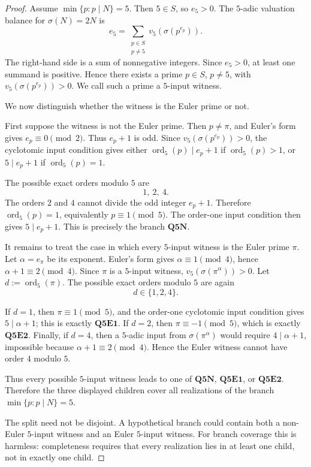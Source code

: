 \documentclass[11pt]{article}
\theoremstyle{definition}
\theoremstyle{remark}
\begin{document}
\begin{proof}
Assume \(\min\{p:p\mid N\}=5\).  Then \(5\in S\), so \(e_5>0\).  The
\(5\)-adic valuation balance for \(\sigma(N)=2N\) is
\[
  e_5
  =
  \sum_{\substack{p\in S\\p\ne5}}
  v_5(\sigma(p^{e_p})).
\]
The right-hand side is a sum of nonnegative integers.  Since \(e_5>0\), at least
one summand is positive.  Hence there exists a prime \(p\in S\), \(p\ne5\),
with \(v_5(\sigma(p^{e_p}))>0\).  We call such a prime a \(5\)-input witness.

We now distinguish whether the witness is the Euler prime or not.

First suppose the witness is not the Euler prime.  Then \(p\ne\pi\), and Euler's
form gives \(e_p\equiv0\pmod2\).  Thus \(e_p+1\) is odd.  Since
\(v_5(\sigma(p^{e_p}))>0\),
the cyclotomic input condition gives either
\(\operatorname{ord}_5(p)\mid e_p+1\) if \(\operatorname{ord}_5(p)>1\), or
\(5\mid e_p+1\) if \(\operatorname{ord}_5(p)=1\).

The possible exact orders modulo \(5\) are
\[
  1,\ 2,\ 4.
\]
The orders \(2\) and \(4\) cannot divide the odd integer \(e_p+1\).  Therefore
\(\operatorname{ord}_5(p)=1\), equivalently \(p\equiv1\pmod5\).  The order-one
input condition then gives \(5\mid e_p+1\).  This is precisely the branch
\(\mathbf{Q5N}\).

It remains to treat the case in which every \(5\)-input witness is the Euler
prime \(\pi\).  Let \(\alpha=e_\pi\) be its exponent.  Euler's form gives
\(\alpha\equiv1\pmod4\), hence \(\alpha+1\equiv2\pmod4\).  Since \(\pi\) is a
\(5\)-input witness, \(v_5(\sigma(\pi^\alpha))>0\).  Let
\(d:=\operatorname{ord}_5(\pi)\).
The possible exact orders modulo \(5\) are again
\[
  d\in\{1,2,4\}.
\]

If \(d=1\), then \(\pi\equiv1\pmod5\), and the order-one cyclotomic input
condition gives \(5\mid\alpha+1\); this is exactly \(\mathbf{Q5E1}\).  If
\(d=2\), then \(\pi\equiv-1\pmod5\), which is exactly \(\mathbf{Q5E2}\).  Finally,
if \(d=4\), then a \(5\)-adic input from \(\sigma(\pi^\alpha)\) would require
\(4\mid\alpha+1\), impossible because \(\alpha+1\equiv2\pmod4\).  Hence the
Euler witness cannot have order \(4\) modulo \(5\).

Thus every possible \(5\)-input witness leads to one of \(\mathbf{Q5N}\),
\(\mathbf{Q5E1}\), or \(\mathbf{Q5E2}\).  Therefore the three displayed
children cover all realizations of the branch \(\min\{p:p\mid N\}=5\).

The split need not be disjoint.  A hypothetical branch could contain both a
non-Euler \(5\)-input witness and an Euler \(5\)-input witness.  For branch
coverage this is harmless: completeness requires that every realization lies in
at least one child, not in exactly one child.
\end{proof}
\end{document}
